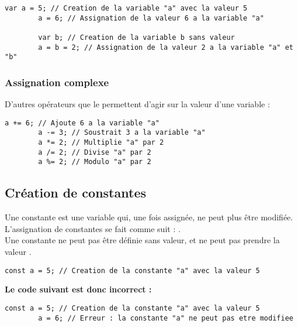 \documentclass[../userguide.tex]{subfiles}
\begin{document}
    \begin{lstlisting}[label={lst:var-ex-3}]
        var a = 5; // Creation de la variable "a" avec la valeur 5
        a = 6; // Assignation de la valeur 6 a la variable "a"

        var b; // Creation de la variable b sans valeur
        a = b = 2; // Assignation de la valeur 2 a la variable "a" et "b"
    \end{lstlisting}

    \subsubsection{Assignation complexe}
    \parindent

    D'autres opérateurs que le \code{=} permettent d'agir sur la valeur d'une variable :

    \begin{lstlisting}[label={lst:var-ex-4}]
        a += 6; // Ajoute 6 a la variable "a"
        a -= 3; // Soustrait 3 a la variable "a"
        a *= 2; // Multiplie "a" par 2
        a /= 2; // Divise "a" par 2
        a %= 2; // Modulo "a" par 2
    \end{lstlisting}

    \subsection{Création de constantes} \label{subsec:creation-de-constantes}
    \parindent

    Une constante est une variable qui, une fois assignée, ne peut plus être modifiée.
    L'assignation de constantes se fait comme suit : . \\
    Une constante ne peut pas être définie sans valeur, et ne peut pas prendre la valeur .

    \begin{lstlisting}[label={lst:var-ex-5}]
        const a = 5; // Creation de la constante "a" avec la valeur 5
    \end{lstlisting}

    \textbf{Le code suivant est donc incorrect :}
    \begin{lstlisting}[label={lst:var-ex-6}]
        const a = 5; // Creation de la constante "a" avec la valeur 5
        a = 6; // Erreur : la constante "a" ne peut pas etre modifiee
    \end{lstlisting}
\end{document}
